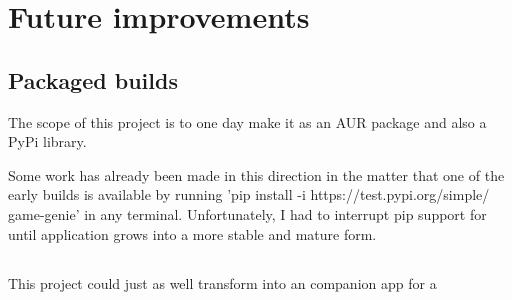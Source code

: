     \section{Future improvements}
        

        \subsection{Packaged builds}
            The scope of this project is to one day make it as an AUR package and also a PyPi library.

            Some work has already been made in this direction in the matter that one of the early builds is available by running 'pip install -i https://test.pypi.org/simple/ game-genie' in any terminal.
            Unfortunately, I had to interrupt pip support for until application grows into a more stable and mature form.


        \subsection{}
            This project could just as well transform into an companion app for a 

            









